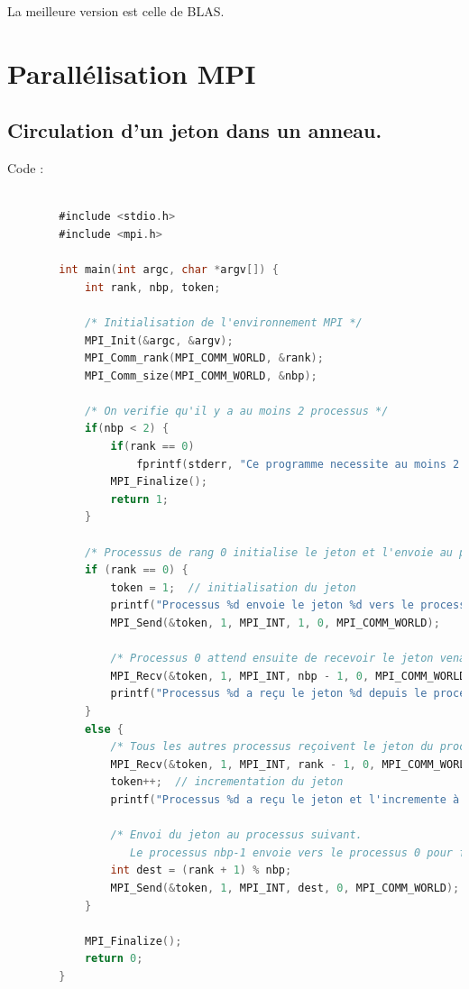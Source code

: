 \documentclass[a4paper,13pt]{book}
\begin{document}
La meilleure version est celle de BLAS.
\section{Parallélisation MPI}
\subsection{Circulation d'un jeton dans un anneau.}


Code : \\

	\begin{lstlisting}[language=C]

        #include <stdio.h>
        #include <mpi.h>
        
        int main(int argc, char *argv[]) {
            int rank, nbp, token;
        
            /* Initialisation de l'environnement MPI */
            MPI_Init(&argc, &argv);
            MPI_Comm_rank(MPI_COMM_WORLD, &rank);
            MPI_Comm_size(MPI_COMM_WORLD, &nbp);
        
            /* On verifie qu'il y a au moins 2 processus */
            if(nbp < 2) {
                if(rank == 0)
                    fprintf(stderr, "Ce programme necessite au moins 2 processus.\n");
                MPI_Finalize();
                return 1;
            }
        
            /* Processus de rang 0 initialise le jeton et l'envoie au processus de rang 1 */
            if (rank == 0) {
                token = 1;  // initialisation du jeton
                printf("Processus %d envoie le jeton %d vers le processus 1\n", rank, token);
                MPI_Send(&token, 1, MPI_INT, 1, 0, MPI_COMM_WORLD);
                
                /* Processus 0 attend ensuite de recevoir le jeton venant du dernier processus */
                MPI_Recv(&token, 1, MPI_INT, nbp - 1, 0, MPI_COMM_WORLD, MPI_STATUS_IGNORE);
                printf("Processus %d a reçu le jeton %d depuis le processus %d\n", rank, token, nbp - 1);
            }
            else {
                /* Tous les autres processus reçoivent le jeton du processus precedent */
                MPI_Recv(&token, 1, MPI_INT, rank - 1, 0, MPI_COMM_WORLD, MPI_STATUS_IGNORE);
                token++;  // incrementation du jeton
                printf("Processus %d a reçu le jeton et l'incremente à %d\n", rank, token);
        
                /* Envoi du jeton au processus suivant.
                   Le processus nbp-1 envoie vers le processus 0 pour fermer l'anneau. */
                int dest = (rank + 1) % nbp;
                MPI_Send(&token, 1, MPI_INT, dest, 0, MPI_COMM_WORLD);
            }
        
            MPI_Finalize();
            return 0;
        }
        
\end{lstlisting}
\end{document}
